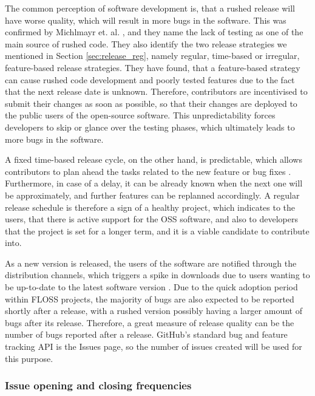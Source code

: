 The common perception of software development is, that a rushed release will have worse quality, which will result in more bugs in the software. This was confirmed by Michlmayr et. al. \cite{michlmayrWhyHowShould2015}, and they name the lack of testing as one of the main source of rushed code. They also identify the two release strategies we mentioned in Section \ref{sec:release_reg}, namely regular, time-based or irregular, feature-based release strategies. They have found, that a feature-based strategy can cause rushed code development and poorly tested features due to the fact that the next release date is unknown. Therefore, contributors are incentivised to submit their changes as soon as possible, so that their changes are deployed to the public users of the open-source software. This unpredictability forces developers to skip or glance over the testing phases, which ultimately leads to more bugs in the software.

A fixed time-based release cycle, on the other hand, is predictable, which allows contributors to plan ahead the tasks related to the new feature or bug fixes \cite{michlmayrWhyHowShould2015}. Furthermore, in case of a delay, it can be already known when the next one will be approximately, and further features can be replanned accordingly. A regular release schedule is therefore a sign of a healthy project, which indicates to the users, that there is active support for the OSS software, and also to developers that the project is set for a longer term, and it is a viable candidate to contribute into.

As a new version is released, the users of the software are notified through the distribution channels, which triggers a spike in downloads due to users wanting to be up-to-date to the latest software version \cite{khomhFasterReleasesImprove2012}. Due to the quick adoption period within FLOSS projects, the majority of bugs are also expected to be reported shortly after a release, with a rushed version possibly having a larger amount of bugs after its release. Therefore, a great measure of release quality can be the number of bugs reported after a release. GitHub's standard bug and feature tracking API is the Issues page, so the number of issues created will be used for this purpose. 

\subsubsection{Issue opening and closing frequencies}

